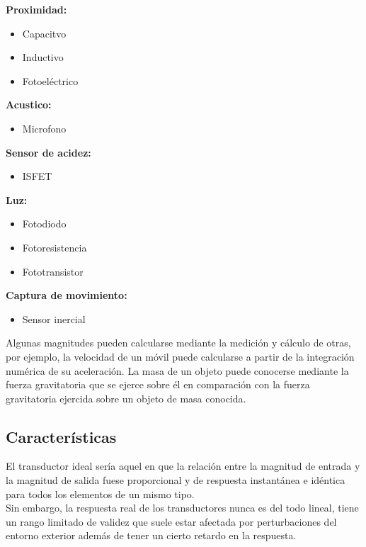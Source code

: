 \textbf{Proximidad:}
\begin{itemize}
  \item     Capacitvo
  \item     Inductivo
  \item     Fotoeléctrico
\end{itemize}

\textbf{Acustico:}
\begin{itemize}
  \item     Microfono
\end{itemize}

\textbf{Sensor de acidez:}
\begin{itemize}
  \item     ISFET
\end{itemize}

\textbf{Luz:}
\begin{itemize}
  \item     Fotodiodo
  \item     Fotoresistencia
  \item     Fototransistor
\end{itemize}

\textbf{Captura de movimiento:}
\begin{itemize}
  \item     Sensor inercial
\end{itemize}

Algunas magnitudes pueden calcularse mediante la medición y cálculo de otras, por ejemplo, la velocidad de un móvil puede calcularse a partir de la integración numérica de su 
aceleración. La masa de un objeto puede conocerse mediante la fuerza gravitatoria que se ejerce sobre él en comparación con la fuerza gravitatoria ejercida sobre un objeto de 
masa conocida. \\

\subsection{Características}

El transductor  ideal  sería  aquel  en  que  la  relación  entre la magnitud de entrada y la 
magnitud de salida fuese proporcional y de respuesta instantánea e idéntica para todos los elementos de un mismo tipo. \\

Sin  embargo, la  respuesta  real  de  los  transductores  nunca  es del todo lineal, tiene un rango  limitado  de  validez que  suele  estar afectada por perturbaciones del entorno exterior además de tener un cierto retardo en la respuesta. \\

